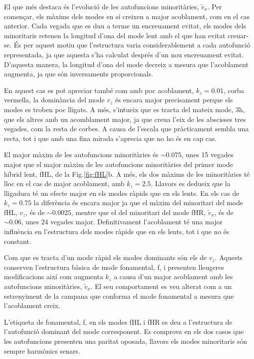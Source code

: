 \documentclass[12pt,a4paper]{article}
\numberwithin{equation}{section}
\begin{document}
El que més destaca és l'evolució de les autofuncions minoritàries, $\tilde{v}_{x}$.
Per començar, els màxims dels modes en sí creixen a major acoblament, com en el cas anterior.
Cada vegada que es duu a terme un encreuament evitat, els modes dels minoritaris retenen la longitud d'ona del mode lent amb el que han evitat creuar-se.
És per aquest motiu que l'estructura varia considerablement a cada autofunció representada, ja que aquesta s'ha calculat després d'un nou encreuament evitat.
D'aquesta manera, la longitud d'ona del mode decreix a mesura que l'acoblament augmenta, ja que són inversaments proporcionals.

En aquest cas es pot apreciar també com amb poc acoblament, $k_z = 0.01$,
corba vermella, la dominància del mode $v_z$ és encara major precisament perque els modes es troben poc lligats.
A més, s'intueix que es tracta del mateix mode, 3h, que els altres amb un acomblament major,
ja que creua l'eix de les abscisses tres vegades, com la resta de corbes.
A causa de l'escala que pràcticament sembla una recta, tot i que amb una fina mirada s'aprecia que no ho és en cap cas.

El major màxim de les autofuncions minoritàries és $\sim 0.075$,
unes 15 vegades major que el major màxim de les autofuncions minoritàries del primer mode híbrid lent, fHL, de la Fig.\ref{fig:fHL}b.
A més, els dos màxims de les minoritàries té lloc en el cas de major acoblament, amb $k_z = 2.5$.
Llavors es dedueix que la lligadura té un efecte major en els modes ràpids que en els lents.
En els cas de $k_z = 0.75$ la diferència és encara major ja que el màxim del minoritari del mode fHL, $v_z$, és de $\sim 0.0025$,
mentre que el del minoritari del mode fHR, $\tilde{v}_{x}$, és de $\sim 0.06$, unes 24 vegades major.
Definitivament l'acoblament té una major influència en l'estructura dels modes ràpids que en els lents, tot i que no és constant.

Com que es tracta d'un mode ràpid els modes dominants són els de $v_z$. Aquests conserven l'estructura bàsica de mode fonamental, f,
i presenten lleugeres modificacions així com augmenta $k_z$ a causa d'un major acoblament amb les autofuncions minoritàries, $\tilde{v}_{x}$.
El seu comportament es veu alterat com a un estrenyiment de la campana que conforma el mode fonamental a mesura que l'acoblament creix.

L'etiqueta de fonamental, f, en els modes fHL i fHR es deu a l'estructura de l'autofunció dominant del mode corresponent.
Es comprova en els dos casos que les autofuncions presenten una paritat oposada, llavors els modes minoritaris són sempre harmònics senars.
\end{document}
